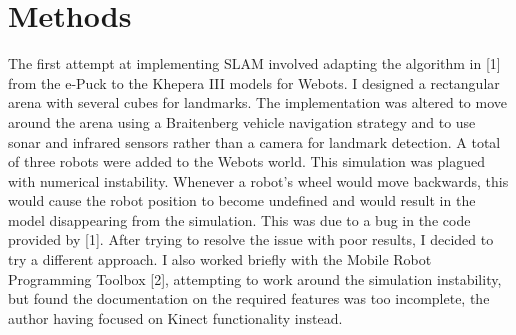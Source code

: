 \documentclass[12pt]{report}
\begin{document}
\section{Methods}

The first attempt at implementing SLAM involved adapting the algorithm in [1] from the e-Puck to the Khepera III models for Webots.  I designed a rectangular arena with several cubes for landmarks.  The implementation was altered to move around the arena using a Braitenberg vehicle navigation strategy and to use sonar and infrared sensors rather than a camera for landmark detection.  A total of three robots were added to the Webots world.  This simulation was plagued with numerical instability.  
Whenever a robot’s wheel would move backwards, this would cause the robot position to become undefined and would result in the model disappearing from the simulation.  This was due to a bug in the code provided by [1].  After trying to resolve the issue with poor results, I decided to try a different approach.  I also worked briefly with the Mobile Robot Programming Toolbox [2], attempting to work around the simulation instability, but found the documentation on the required features was too incomplete, the author having focused on Kinect functionality instead.
\end{document}
